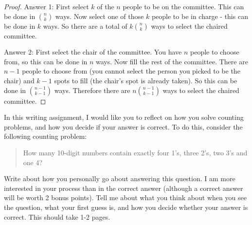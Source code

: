 \documentclass[11pt]{exam}
\begin{document}
\begin{questions}
\begin{parts}
\begin{solution}
\begin{proof}
      Answer 1: First select $k$ of the $n$ people to be on the committee.  This can be done in ${n \choose k}$ ways.  Now select one of those $k$ people to be in charge - this can be done in $k$ ways.  So there are a total of $k {n \choose k}$ ways to select the chaired committee.
      
      Answer 2: First select the chair of the committee.  You have $n$ people to choose from, so this can be done in $n$ ways.  Now fill the rest of the committee.  There are $n-1$ people to choose from (you cannot select the person you picked to be the chair) and $k-1$ spots to fill (the chair's spot is already taken).  So this can be done in ${n-1 \choose k-1}$ ways.  Therefore there are $n{n-1 \choose k-1}$ ways to select the chaired committee.
    \end{proof}

  \end{solution}

\end{parts}

\vfill


\question[8] In this writing assignment, I would like you to reflect on how you solve counting problems, and how you decide if your answer is correct.  To do this, consider the following counting problem:

\begin{quote}
	How many 10-digit numbers contain exactly four 1's, three 2's, two 3's and one 4?
\end{quote} 

Write about how you personally go about answering this question.  I am more interested in your process than in the correct answer (although a correct answer will be worth 2 bonus points).  Tell me about what you think about when you see the question, what your first guess is, and how you decide whether your answer is correct.  This should take 1-2 pages.


\end{questions}
\end{document}
